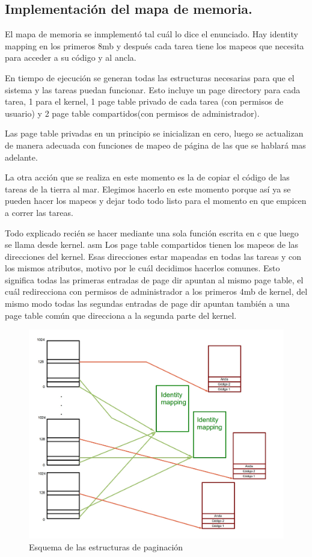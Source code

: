 \subsection{Implementación del mapa de memoria.}
	El mapa de memoria se inmplementó tal cuál lo dice el enunciado. Hay
identity mapping en los primeros 8mb y después cada tarea tiene
los mapeos que necesita para acceder a su código y al ancla.
	
	En tiempo de ejecución se generan todas las estructuras necesarias
para que el sistema y las tareas puedan funcionar. Esto incluye un page directory para cada
tarea, 1 para el kernel, 1 page table privado de cada tarea (con
permisos de usuario) y 2 page table compartidos(con permisos de administrador).

	Las page table privadas en un principio se inicializan en cero, luego
se actualizan de manera adecuada con funciones de mapeo de página
de las que se hablará mas adelante.

	La otra acción que se realiza en este momento es la de
copiar el código de las tareas de la tierra al mar. Elegimos hacerlo
en este momento porque así ya se pueden hacer los mapeos y dejar
todo todo listo para el momento en que empicen a correr las tareas.

	Todo explicado recién se hacer mediante una sola función escrita en c
que luego se llama desde kernel. asm
\newpage
	Los page table compartidos tienen los mapeos de las direcciones del kernel.
Esas direcciones estar mapeadas en todas las tareas y con los mismos atributos, motivo
por le cuál decidimos hacerlos comunes. Esto significa todas las primeras entradas
de page dir apuntan al mismo page table, el cuál redirecciona con permisos de administrador
a los primeros 4mb de kernel, del mismo modo todas las segundas entradas
de page dir apuntan también a una page table común que direcciona
a la segunda parte del kernel.


\begin{figure}[h]
\begin{center}
  \includegraphics[scale=0.3]{secciones/dibujitos/diagramapaginas.jpg}
\end{center}
\caption{Esquema de las estructuras de paginación}
\label{fig:diagramapaginas}
\end{figure}


